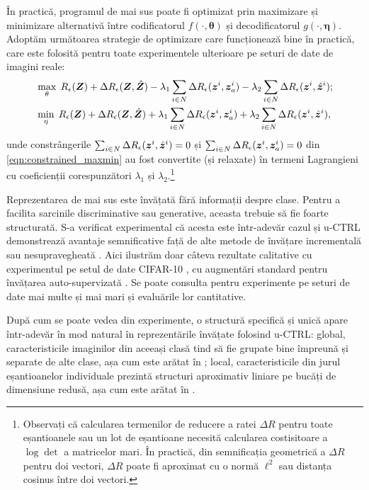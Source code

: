 \documentclass[../../book-main_ro.tex]{subfiles}
\begin{document}
În practică, programul de mai sus poate fi optimizat prin maximizare și minimizare alternativă între codificatorul $f(\cdot,\bm \theta)$ și decodificatorul $g(\cdot,\bm \eta)$. Adoptăm următoarea strategie de optimizare care funcționează bine în practică, care este folosită pentru toate experimentele ulterioare pe seturi de date de imagini reale:
\vspace{-1mm}
\begin{align}
  &  \max_{\theta}\; R_\epsilon(\bm{Z}) + \Delta{R_\epsilon(\bm{Z}, \hat{\bm{Z}})-\lambda_{1}\sum_{i\in N} \Delta R_\epsilon(\bm{z}^i, \bm{z}_{a}^i)} -\lambda_{2}\sum_{i\in N} \Delta R_\epsilon(\bm{z}^i, \hat{\bm{z}}^i) \label{eqn:constrained_max}; \\
   & \min_{\eta}\; R_\epsilon(\bm{Z}) + \Delta{R_\epsilon(\bm{Z}, \hat{\bm{Z}})+\lambda_{1}\sum_{i\in N} \Delta R_\epsilon(\bm{z}^i, \bm{z}_{a}^i)+ \lambda_{2}\sum_{i\in N} \Delta R_\epsilon(\bm{z}^i, \hat{\bm{z}}^i)} \label{eqn:constrained_min},
\end{align}
unde constrângerile $\sum_{i\in N} \Delta R_\epsilon(\bm{z}^i, \hat{\bm{z}}^i) = 0$ și $\sum_{i\in N} \Delta R_\epsilon(\bm{z}^i, \bm{z}_{a}^i) = 0$ din \eqref{eqn:constrained_maxmin} au fost convertite (și relaxate) în termeni Lagrangieni cu coeficienții corespunzători $\lambda_{1}$ și $\lambda_{2}$.\footnote{Observați că calcularea termenilor de reducere a ratei $\Delta R$ pentru toate eșantioanele sau un lot de eșantioane necesită calcularea costisitoare a $\log\det$ a matricelor mari. În practică, din semnificația geometrică a $\Delta R$ pentru doi vectori, $\Delta R$ poate fi aproximat cu o normă $\ell^2$ sau distanța cosinus între doi vectori.}

Reprezentarea de mai sus este învățată fără informații despre clase. Pentru a facilita sarcinile discriminative sau generative, aceasta trebuie să fie foarte structurată. S-a verificat experimental că acesta este într-adevăr cazul și u-CTRL demonstrează avantaje semnificative față de alte metode de învățare incrementală sau nesupravegheată \cite{pmlr-v234-tong24a}. Aici ilustrăm doar câteva rezultate calitative cu experimentul pe setul de date CIFAR-10 \cite{krizhevsky2014cifar}, cu augmentări standard pentru învățarea auto-supervizată \cite{chen2020simple}. Se poate consulta \cite{pmlr-v234-tong24a} pentru experimente pe seturi de date mai multe și mai mari și evaluările lor cantitative.

După cum se poate vedea din experimente, o structură specifică și unică apare într-adevăr în mod natural în reprezentările învățate folosind u-CTRL: global, caracteristicile imaginilor din aceeași clasă tind să fie grupate bine împreună și separate de alte clase, așa cum este arătat în ; local, caracteristicile din jurul eșantioanelor individuale prezintă structuri aproximativ liniare pe bucăți de dimensiune redusă, așa cum este arătat în .
\end{document}
